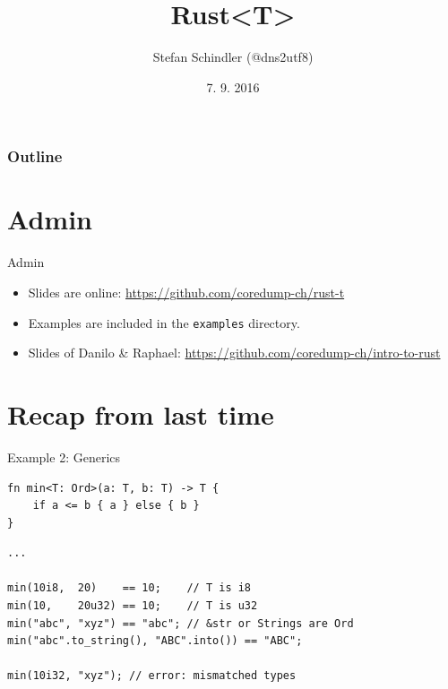 \documentclass[aspectratio=1610,t]{beamer}
\title{Rust<T>}
\date{7. 9. 2016}
\author{Stefan Schindler (@dns2utf8)}
\institute{Coredump Rapperswil}
\begin{document}
{
\maketitle
}

\begin{frame}[noframenumbering]
	\frametitle{Outline}
	\tableofcontents
\end{frame}



{
\section{Admin}
}

\begin{frame}[fragile]{Admin}

\begin{itemize}
  \item Slides are online:
        \url{https://github.com/coredump-ch/rust-t}
  \item Examples are included in the \texttt{examples} directory.
  \item Slides of Danilo \& Raphael:
        \url{https://github.com/coredump-ch/intro-to-rust}
\end{itemize}

\end{frame}

{
\section{Recap from last time}
}

\begin{frame}[fragile]{Example 2: Generics}

\begin{verbatim}
fn min<T: Ord>(a: T, b: T) -> T {
    if a <= b { a } else { b }
}
\end{verbatim}
\pause
\begin{verbatim}
...

min(10i8,  20)    == 10;    // T is i8
min(10,    20u32) == 10;    // T is u32
min("abc", "xyz") == "abc"; // &str or Strings are Ord
min("abc".to_string(), "ABC".into()) == "ABC";

min(10i32, "xyz"); // error: mismatched types
\end{verbatim}

\end{frame}
\end{document}
